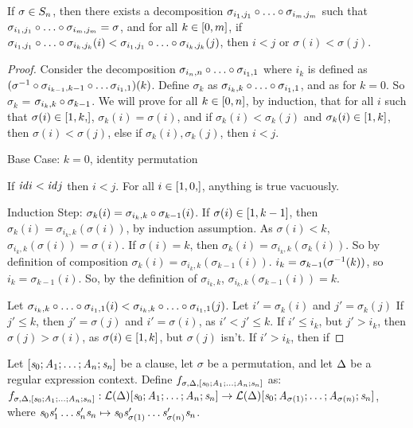 \begin{lemma}
If $\sigma\in S_{n}$, then there exists a decomposition
$\sigma_{i_1,j_1}\circ\ldots\circ\sigma_{i_m,j_m}$ such that
$\sigma_{i_1,j_1}\circ\ldots\circ\sigma_{i_m,j_m}=\sigma$,
and for all $k\in[0,m]$,
if $\sigma_{i_1,j_1}\circ\ldots\circ\sigma_{i_k,j_k}(i)<
\sigma_{i_1,j_1}\circ\ldots\circ\sigma_{i_k,j_k}(j)$,
then $i<j$ or $\sigma(i)<\sigma(j)$.
\begin{proof}
Consider the decomposition $\sigma_{i_n,n}\circ\ldots\circ\sigma_{i_1,1}$ where $i_k$ is defined as
$(\sigma^{-1}\circ\sigma_{i_{k-1},k-1}\circ\ldots\sigma_{i_1,1})(k)$.
Define $\sigma_k$ as $\sigma_{i_k,k}\circ\ldots\circ\sigma_{i_1,1}$, and as \Identity{} for $k=0$.
So $\sigma_k$ = $\sigma_{i_k,k}\circ\sigma_{k-1}$.
We will prove for all $k\in[0,n]$, by induction, that
for all $i$ such that $\sigma(i)\in\RangeIncInc{1,k}$, $\sigma_k(i)=\sigma(i)$,
and if
$\sigma_k(i)<\sigma_k(j)$
and $\sigma_k(i)\in[1,k]$, then $\sigma(i)<\sigma(j)$,
else if $\sigma_k(i),\sigma_k(j)$, then $i<j$.

Base Case: $k=0$, identity permutation

If $\mathit{id} i<\mathit{id} j$ then $i < j$.  For all $i\in\RangeIncInc{1,0}$, anything is true vacuously.

Induction Step:
$\sigma_k(i)=\sigma_{i_k,k}\circ\sigma_{k-1}(i)$.
If $\sigma(i)\in[1,k-1]$, then $\sigma_k(i)=\sigma_{i_k,k}(\sigma(i))$, by induction assumption.
As $\sigma(i)<k$, $\sigma_{i_k,k}(\sigma(i))=\sigma(i)$.
If $\sigma(i)=k$, then $\sigma_k(i)=\sigma_{i_k,k}(\sigma_k(i))$.
So by definition of composition $\sigma_k(i)=\sigma_{i_k,k}(\sigma_{k-1}(i))$.
$i_k=\sigma_{k-1}(\sigma^{-1}(k))$, so $i_k=\sigma_{k-1}(i)$.
So, by the definition of $\sigma_{i_k,k}$, $\sigma_{i_k,k}(\sigma_{k-1}(i))=k$.

Let $\sigma_{i_k,k}\circ\ldots\circ\sigma_{i_1,1}(i) < \sigma_{i_k,k}\circ\ldots\circ\sigma_{i_1,1}(j)$.
Let $i'=\sigma_k(i)$
and $j'=\sigma_k(j)$
If $j'\leq k$, then $j'=\sigma(j)$ and $i'=\sigma(i)$, as $i'<j'\leq k$.
If $i'\leq i_k$, but $j'>i_k$, then $\sigma(j)>\sigma(i)$, as $\sigma(i)\in[1,k]$,
but $\sigma(j)$ isn't.
If $i' > i_k$, then if 
\end{proof}
\end{lemma}

\begin{definition}
Let $[\mathit{s}_0;\mathit{A}_1;\ldots;\mathit{A}_n;\mathit{s}_n]$ be a clause, let $\sigma$ be a permutation, and let $\Delta$ be a regular expression context.
Define
$f_{\sigma,\Delta,[\mathit{s}_0;\mathit{A}_1;\ldots;\mathit{A}_n;\mathit{s}_n]}$ as:
$f_{\sigma,\Delta,[\mathit{s}_0;\mathit{A}_1;\ldots;\mathit{A}_n;\mathit{s}_n]}: \mathcal{L}(\Delta){[\mathit{s}_0;\mathit{A}_1;\ldots;\mathit{A}_n;\mathit{s}_n]}\rightarrow\mathcal{L}(\Delta){[\mathit{s}_0;\mathit{A}_{\sigma(1)};\ldots;\mathit{A}_{\sigma(n)};\mathit{s}_n]}$, where $\mathit{s}_0\mathit{s}_1'\ldots\mathit{s}_n'\mathit{s}_n\mapsto\mathit{s}_0\mathit{s}_{\sigma(1)}'\ldots\mathit{s}_{\sigma(n)}'\mathit{s}_n$.
\end{definition}

